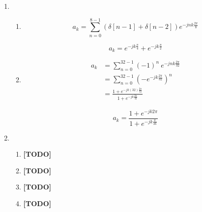 \documentclass[]{article}
\begin{document}
\begin{enumerate}
\def\labelenumi{\arabic{enumi}.}
\setcounter{enumi}{4}
\item
  \begin{enumerate}
  \def\labelenumii{\alph{enumii}.}
  \item
    \[
        a_k = \sum_{n = 0}^{8 - 1} (\delta[n - 1] + \delta[n - 2]) e^{-j n k \frac{2\pi}{8}}
    \]

    \[
        \boxed{a_k = e^{-jk\frac{\pi}{4}} + e^{-jk\frac{\pi}{2}}}
    \]
  \item
    \begin{align*}
        a_k &= \sum_{n = 0}^{32 - 1} (-1)^n ~ e^{-j n k \frac{2\pi}{32}} \\
            &= \sum_{n = 0}^{32 - 1} (-e^{-j k \frac{2\pi}{32}})^n \\
            &= \frac{1 + e^{-jk(32) \frac{2\pi}{32} }}{1 + e^{-jk\frac{2\pi}{32}}}
    \end{align*}

    \[
        \boxed{a_k = \frac{1 + e^{-jk 2\pi}}{1 + e^{-jk\frac{\pi}{16}}}}
    \]
  \end{enumerate}
\item
  \begin{enumerate}
  \def\labelenumii{\alph{enumii}.}
  \item
    \textbf{{[}TODO{]}}
  \item
    \textbf{{[}TODO{]}}
  \item
    \textbf{{[}TODO{]}}
  \item
    \textbf{{[}TODO{]}}
  \end{enumerate}
\end{enumerate}
\end{document}
